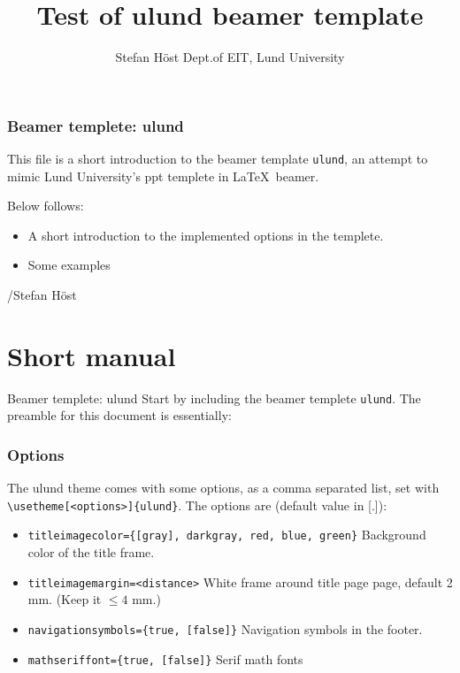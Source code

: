 \documentclass[aspectratio=1610]{beamer}
\title[ulund beamer]{Test of ulund beamer template}
\author[S. Höst]{%
  Stefan Höst\newline
  Dept.\@ of EIT, Lund University}
\begin{document}
\begin{frame}[plain]%
  \titlepage
\end{frame}

\begin{frame}
  \frametitle{Beamer templete: ulund}
  This file is a short introduction to the beamer template \texttt{ulund}, an attempt to mimic Lund University's ppt templete in \LaTeX\ beamer.

Below follows:
\begin{itemize}
\item A short introduction to the implemented options in the templete. 
\item Some examples
\end{itemize}

/Stefan Höst
\end{frame}


\section{Short manual}

\begin{frame}[fragile]{Beamer templete: ulund}
  Start by including the beamer templete \verb|ulund|. The preamble for this document is essentially: 
\end{frame}

\begin{frame}[fragile]
  \frametitle{Options}
  The ulund theme comes with some options, as a comma separated list, set with
  \verb|\usetheme[<options>]{ulund}|.\newline
  The options are (default value in [.]):
  \begin{itemize}
  \item \verb|titleimagecolor={[gray], darkgray, red, blue, green}|\newline
    Background color of the title frame.
  \item \verb|titleimagemargin=<distance>| \newline
    White frame around title page page, default 2 mm. (Keep it $\leq 4$ mm.)
  \item \verb|navigationsymbols={true, [false]}|\newline
    Navigation symbols in the footer.
  \item \verb|mathseriffont={true, [false]}|\newline
    Serif math fonts
  \end{itemize}
\end{frame}
\end{document}
